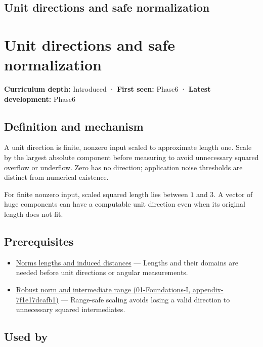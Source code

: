 \hypertarget{appendix-f744e41b95b4}{}
\section*{Unit directions and safe normalization}
\chapter{Unit directions and safe normalization}\label{appendix-f744e41b95b4-unit-directions-and-safe-normalization}

\textbf{Curriculum depth:} Introduced · \textbf{First seen:} Phase6 · \textbf{Latest development:} Phase6

\section{Definition and mechanism}\label{appendix-f744e41b95b4-definition-and-mechanism}

A unit direction is finite, nonzero input scaled to approximate length one. Scale by the largest absolute component before measuring to avoid unnecessary squared overflow or underflow. Zero has no direction; application noise thresholds are distinct from numerical existence.

For finite nonzero input, scaled squared length lies between \(1\) and \(3\). A vector of huge components can have a computable unit direction even when its original length does not fit.

\section{Prerequisites}\label{appendix-f744e41b95b4-prerequisites}

\begin{itemize}
\tightlist
\item
  \hyperref[appendix-49933872bb51]{Norms lengths and induced distances} --- Lengths and their domains are needed before unit directions or angular measurements.
\item
  \href{../01-Foundations-I/main.pdf\#nameddest=appendix-7f1e17dcafb1}{Robust norm and intermediate range (01-Foundations-I, appendix-7f1e17dcafb1)} --- Range-safe scaling avoids losing a valid direction to unnecessary squared intermediates.
\end{itemize}

\section{Used by}\label{appendix-f744e41b95b4-used-by}

